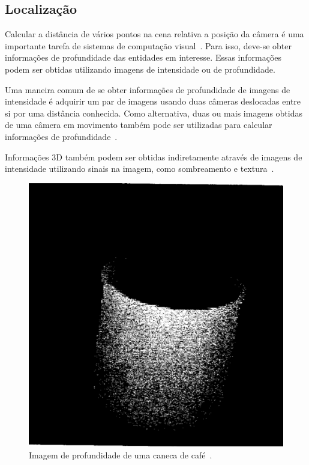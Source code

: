 \subsection{Localização}

	Calcular a distância de vários pontos na cena relativa a posição da câmera é uma importante tarefa de sistemas de computação visual~\cite{jain}. Para isso, deve-se obter informações de profundidade das entidades em interesse. Essas informações podem ser obtidas utilizando imagens de intensidade ou de profundidade.

	Uma maneira comum de se obter informações de profundidade de imagens de intensidade é adquirir um par de imagens usando duas câmeras deslocadas entre si por uma distância conhecida. Como alternativa, duas ou mais imagens obtidas de uma câmera em movimento também pode ser utilizadas para calcular informações de profundidade~\cite{jain}.

	Informações 3D também podem ser obtidas indiretamente através de imagens de intensidade utilizando sinais na imagem, como sombreamento e textura~\cite{jain}.

	\begin{figure}[hbt]
		\begin{center}
			\includegraphics[scale=0.3]{figuras/2.FundamentacaoTeorica/depthimage.png}
		\end{center}
		\caption{Imagem de profundidade de uma caneca de café~\cite{jain}.}
		\label{depthimage}
	\end{figure}

